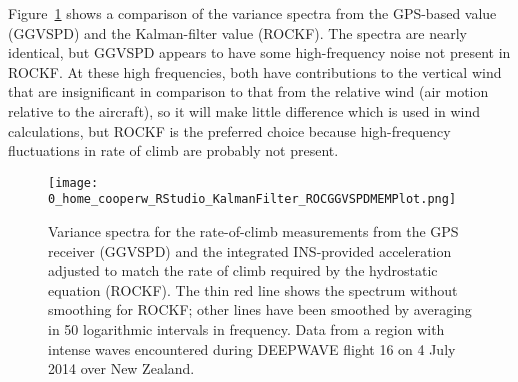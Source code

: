 \documentclass[12pt,twoside,english,12pt,twoside,english]{article}\usepackage[]{graphicx}\usepackage[]{color}
\let\OrgIndex\index
\renewcommand*{\index}[1]{\OrgIndex{#1}}
\begin{document}
Figure~\ref{fig:Variance-spectra-ROC} shows a comparison
of the variance spectra from the GPS-based
value (GGVSPD) and the Kalman-filter
value (ROCKF).
The spectra are nearly identical, but GGVSPD appears to have some
high-frequency noise
not present in ROCKF. At these high frequencies, both have contributions
to the vertical wind that are insignificant in comparison to that
from the relative wind (air motion relative
to the aircraft), so it will make little difference which is used
in wind calculations, but ROCKF is the preferred
choice because high-frequency fluctuations in rate of climb are probably
not present.

\begin{figure}
\begin{centering}
\texttt{[image: 0\_home\_cooperw\_RStudio\_KalmanFilter\_ROCGGVSPDMEMPlot.png]}
\par\end{centering}
\caption[Variance spectra for the rate-of-climb measurements from the GPS receiver and the integrated INS-provided acceleration.]{Variance spectra for the rate-of-climb measurements from the GPS receiver (GGVSPD) and the integrated INS-provided acceleration adjusted to match the rate of climb required by the hydrostatic equation (ROCKF). The thin red line shows the spectrum without smoothing for ROCKF; other lines have been smoothed by averaging in 50 logarithmic intervals in frequency. Data from a region with intense waves encountered during DEEPWAVE flight 16 on 4 July 2014 over New Zealand.\label{fig:Variance-spectra-ROC}}

\end{figure}
\end{document}
